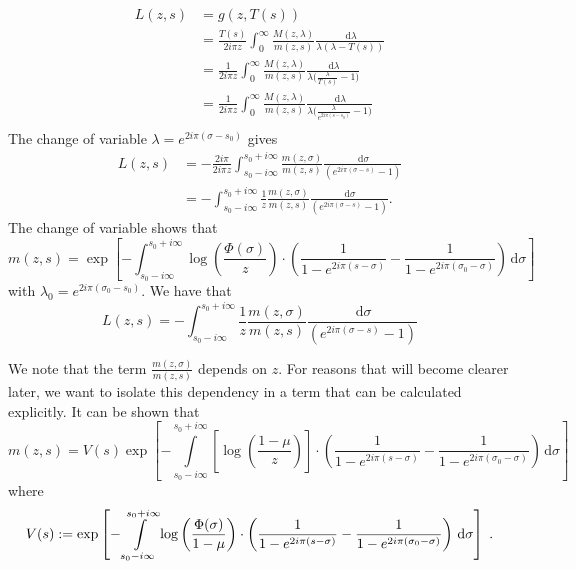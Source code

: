 \documentclass[11pt]{amsart}
\newcommand{\diff}{\,\mathrm{d}}
\begin{document}
\begin{align*}
    L(z,s) &= g(z,T(s)) \\ 
    &= 
    \frac{T(s)}{2i \pi z}\int_0^\infty  \frac{M(z,\lambda)}{m(z,s)} \frac{\diff \lambda}{\lambda(\lambda-T(s))} \\
    &= 
    \frac{1}{2i\pi z}\int_0^\infty  \frac{M(z,\lambda)}{m(z,s)} \frac{\diff \lambda}{\lambda\Big(\frac{\lambda}{T(s)}-1\Big)} \\
    &= 
    \frac{1}{2i\pi z}\int_0^\infty  \frac{M(z,\lambda)}{m(z,s)} \frac{\diff \lambda}{\lambda\Big(\frac{\lambda}{e^{2i\pi(s-s_0)}}-1\Big)} \\
\end{align*}
The change of variable $\lambda = e^{2i\pi(\sigma-s_0)}$ gives
\begin{align*}
    L(z,s)
    &= 
    - \frac{2i\pi }{2i\pi z}\int_{s_0-i\infty}^{s_0+i\infty}  \frac{m(z,\sigma)}{m(z,s)} \frac{\diff \sigma}{(e^{2i\pi(\sigma-s)}-1)} \\
    &= 
   - \int_{s_0-i\infty}^{s_0+i\infty} \frac{1}{z}  \frac{m(z,\sigma)}{m(z,s)} \frac{\diff \sigma}{(e^{2i\pi(\sigma-s)}-1)}. 
\end{align*}
The change of variable shows that
\begin{equation}
    m(z,s) = \exp \left[
    - \int_{s_0-i\infty}^{s_0+i\infty}\log \left( \frac{\Phi(
    \sigma)}{z}\right)
    \cdot \left(
        \frac{1}{1-e^{2i\pi(s-\sigma)}} - \frac{1}{1-e^{2i\pi(\sigma_0-\sigma)}}
     \right) \diff \sigma
    \right]
\end{equation} 
with $\lambda_0 = e^{2i\pi(\sigma_0 - s_0)}$. 
We have that 
\begin{equation}
    L(z,s) 
    = 
   - \int_{s_0-i\infty}^{s_0+i\infty} \frac{1}{z}  \frac{m(z,\sigma)}{m(z,s)} \frac{\diff \sigma}{(e^{2i\pi(\sigma-s)}-1)}
\end{equation}

We note that the term $\frac{m(z,\sigma)}{m(z,s)}$ depends on $z$. For reasons that will become clearer later, we want to isolate this dependency in a term that can be calculated explicitly. 
It can be shown that 
\begin{equation}
    m(z,s) = V(s)
    \exp \left[
    - \int\limits_{s_0-i\infty}^{s_0+i\infty} \left[\log \left( \frac{1-\mu}{z}\right)\right]
    \cdot \left(
        \frac{1}{1-e^{2i\pi(s-\sigma)}} - \frac{1}{1-e^{2i\pi(\sigma_0-\sigma)}}
     \right) \diff \sigma
    \right]
    \label{eq:uselogbranch}
\end{equation}
where 
\begin{equation}
V(s) := \exp \left[
    - \int\limits_{s_0-i\infty}^{s_0+i\infty}\log \left( \frac{\Phi(\sigma)}{1-\mu}\right)
    \cdot \left(
        \frac{1}{1-e^{2i\pi(s-\sigma)}} - \frac{1}{1-e^{2i\pi(\sigma_0-\sigma)}}
     \right) \diff \sigma 
    \right]
    \label{def:V}
    \eqfinp
\end{equation}
\end{document}
